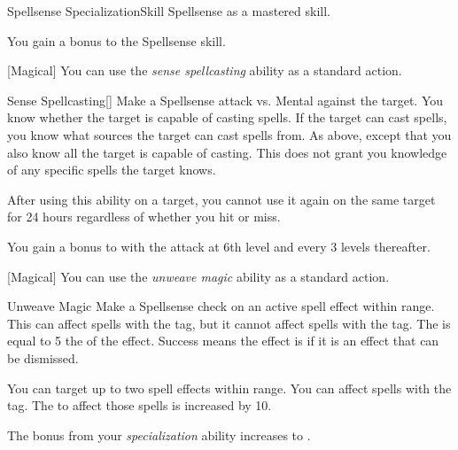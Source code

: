     \begin{feat}{Spellsense Specialization}{Skill}
        \featpre Spellsense as a mastered skill.

         You gain a  bonus to the Spellsense skill.

        [Magical] You can use the \textit{sense spellcasting} ability as a standard action.
        \begin{freeability}{Sense Spellcasting}[]
            Make a Spellsense attack vs. Mental against the target.
            \hit You know whether the target is capable of casting spells.
            If the target can cast spells, you know what sources the target can cast spells from.
            \crit As above, except that you also know all  the target is capable of casting.
            This does not grant you knowledge of any specific spells the target knows.

            After using this ability on a target, you cannot use it again on the same target for 24 hours regardless of whether you hit or miss.

            \rankline
            You gain a  bonus to  with the attack at 6th level and every 3 levels thereafter.
        \end{freeability}

        [Magical] You can use the \textit{unweave magic} ability as a standard action.
        \begin{freeability}{Unweave Magic}
            Make a Spellsense check on an active spell effect within \rngmed range.
            This can affect spells with the  tag, but it cannot affect spells with the  tag.
            The  is equal to 5 \add the  of the effect.
            Success means the effect is  if it is an effect that can be dismissed.

            \rankline
             You can target up to two spell effects within range.
             You can affect spells with the  tag.
            The  to affect those spells is increased by 10.
        \end{freeability}

         The bonus from your \textit{specialization} ability increases to .


\end{feat}
